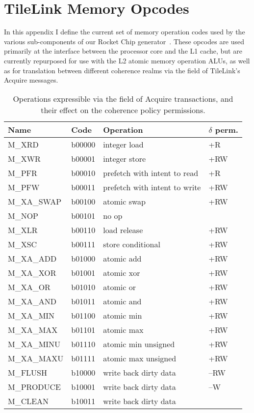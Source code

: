 \chapter{TileLink Memory Opcodes}
\label{a.memopcodes}

In this appendix I define the current set of memory operation codes used by
the various sub-components of our Rocket Chip generator~\cite{rocket}.
These opcodes are used primarily at the interface between the processor core and the L1 cache,
but are currently repurposed for use with the L2 atomic memory operation ALUs,
as well as for translation between different coherence realms via the  field
of TileLink's Acquire messages.

\begin{table}
\centering
\begin{tabular}{|l|l|l|l|}
\hline
Name  & Code & Operation & $\delta$ perm. \\ \hline \hline
M\_XRD      & b00000 & integer load & +R\\ \hline 
M\_XWR      & b00001 & integer store & +RW \\ \hline 
M\_PFR      & b00010 & prefetch with intent to read & +R \\ \hline 
M\_PFW      & b00011 & prefetch with intent to write & +RW \\ \hline 
M\_XA\_SWAP & b00100 & atomic swap & +RW \\ \hline 
M\_NOP      & b00101 & no op & \\ \hline 
M\_XLR      & b00110 & load release & +RW \\ \hline 
M\_XSC      & b00111 & store conditional & +RW \\ \hline 
M\_XA\_ADD  & b01000 & atomic add & +RW  \\ \hline 
M\_XA\_XOR  & b01001 & atomic xor & +RW  \\ \hline 
M\_XA\_OR   & b01010 & atomic or & +RW  \\ \hline 
M\_XA\_AND  & b01011 & atomic and & +RW  \\ \hline 
M\_XA\_MIN  & b01100 & atomic min & +RW  \\ \hline 
M\_XA\_MAX  & b01101 & atomic max & +RW  \\ \hline 
M\_XA\_MINU & b01110 & atomic min unsigned & +RW  \\ \hline 
M\_XA\_MAXU & b01111 & atomic max unsigned & +RW  \\ \hline 
M\_FLUSH    & b10000 & write back dirty data & --RW \\ \hline 
M\_PRODUCE  & b10001 & write back dirty data & --W \\ \hline 
M\_CLEAN    & b10011 & write back dirty data  & \\ \hline
\end{tabular}
\caption{Operations expressible via the  field of Acquire transactions,
and their effect on the coherence policy permissions.}
\label{tab:opcodes}
\end{table}

